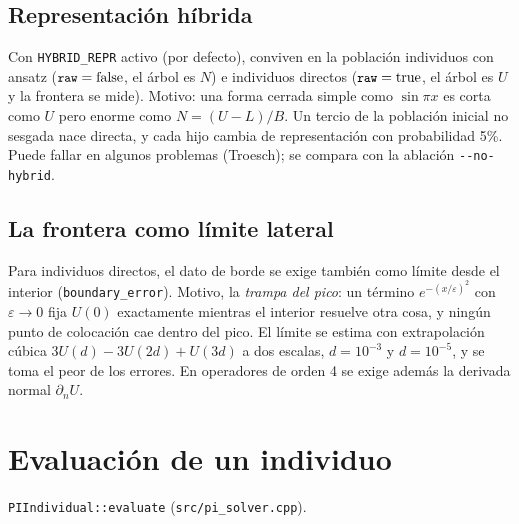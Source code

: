 \documentclass[11pt,a4paper]{article}
\newcommand{\code}[1]{\texttt{\small #1}}
\begin{document}
\subsection{Representación híbrida}
Con \code{HYBRID\_REPR} activo (por defecto), conviven en la población individuos con ansatz
($\code{raw}=\text{false}$, el árbol es $N$) e individuos directos ($\code{raw}=\text{true}$, el árbol es
$U$ y la frontera se mide). Motivo: una forma cerrada simple como $\sin\pi x$ es corta como $U$ pero
enorme como $N=(U-L)/B$. Un tercio de la población inicial no sesgada nace directa, y cada hijo cambia
de representación con probabilidad 5\%. Puede fallar en algunos problemas (Troesch); se compara con la
ablación \code{-{}-no-hybrid}.

\subsection{La frontera como límite lateral}
Para individuos directos, el dato de borde se exige también como límite desde el interior
(\code{boundary\_error}). Motivo, la \emph{trampa del pico}: un término $e^{-(x/\varepsilon)^2}$ con
$\varepsilon\to0$ fija $U(0)$ exactamente mientras el interior resuelve otra cosa, y ningún punto de
colocación cae dentro del pico. El límite se estima con extrapolación cúbica $3U(d)-3U(2d)+U(3d)$ a dos
escalas, $d=10^{-3}$ y $d=10^{-5}$, y se toma el peor de los errores. En operadores de orden 4 se exige
además la derivada normal $\partial_n U$.

\section{Evaluación de un individuo}
\code{PIIndividual::evaluate} (\code{src/pi\_solver.cpp}).
\end{document}
